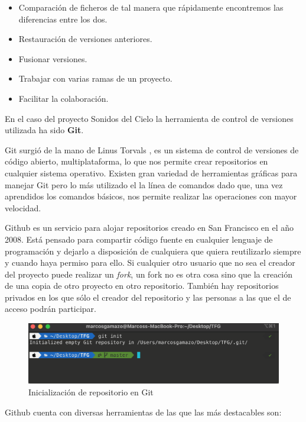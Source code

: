 \begin{itemize}
    \item Comparación de ficheros de tal manera que rápidamente encontremos las diferencias entre los dos. 
    \item Restauración de versiones anteriores.
    \item Fusionar versiones.
    \item Trabajar con varias ramas de un proyecto.
    \item Facilitar la colaboración.
\end{itemize}


En el caso del proyecto Sonidos del Cielo la herramienta de control de versiones utilizada ha sido \textbf{Git}. 

Git surgió de la mano de Linus Torvals \cite{torvalds2005git}, es un sistema de control de versiones de código abierto, multiplataforma, lo que nos permite crear repositorios en cualquier sistema operativo. Existen gran variedad de herramientas gráficas para manejar Git pero lo más utilizado el la línea de comandos dado que, una vez aprendidos los comandos básicos, nos permite realizar las operaciones con mayor velocidad. 

Github es un servicio para alojar repositorios creado en San Francisco en el año 2008. Está pensado para compartir código fuente en cualquier lenguaje de programación y dejarlo a disposición de cualquiera que quiera reutilizarlo siempre y cuando haya permiso para ello. Si cualquier otro usuario que no sea el creador del proyecto puede realizar un \textit{fork}, un fork no es otra cosa sino que la creación de una copia de otro proyecto en otro repositorio.
También hay repositorios privados en los que sólo el creador del repositorio y las personas a las que el de acceso podrán participar.

\begin{figure}[h]
    \centering
    \includegraphics[width=\textwidth]{include/capturas/gitInit.png}
    \caption{Inicialización de repositorio en Git}
    \label{fig:git_init}
\end{figure}


Github cuenta con diversas herramientas de las que las más destacables son:

